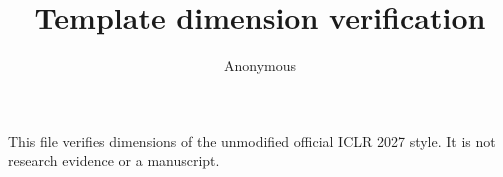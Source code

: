 \documentclass{article}
\title{Template dimension verification}
\author{Anonymous}
\begin{document}
\maketitle
{}
\makeatletter{}\makeatother
This file verifies dimensions of the unmodified official ICLR 2027 style. It is not research evidence or a manuscript.
\end{document}
